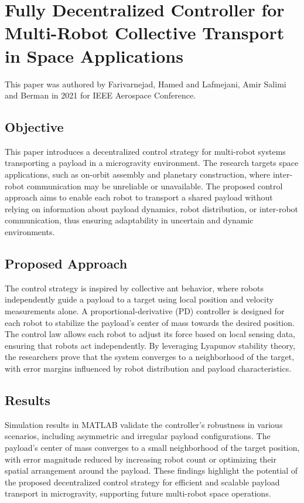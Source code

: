 \documentclass[a4paper,12pt]{article}
\begin{document}
\section{Fully Decentralized Controller for Multi-Robot Collective Transport in Space Applications}
This paper\cite{farivarnejad2021fully} was authored by Farivarnejad, Hamed and Lafmejani, Amir Salimi and Berman in 2021 for IEEE Aerospace Conference. 

\subsection{Objective}
This paper introduces a decentralized control strategy for multi-robot systems transporting a payload in a microgravity environment. The research targets space applications, such as on-orbit assembly and planetary construction, where inter-robot communication may be unreliable or unavailable. The proposed control approach aims to enable each robot to transport a shared payload without relying on information about payload dynamics, robot distribution, or inter-robot communication, thus ensuring adaptability in uncertain and dynamic environments.

\subsection{Proposed Approach}
The control strategy is inspired by collective ant behavior, where robots independently guide a payload to a target using local position and velocity measurements alone. A proportional-derivative (PD) controller is designed for each robot to stabilize the payload’s center of mass towards the desired position. The control law allows each robot to adjust its force based on local sensing data, ensuring that robots act independently. By leveraging Lyapunov stability theory, the researchers prove that the system converges to a neighborhood of the target, with error margins influenced by robot distribution and payload characteristics.

\subsection{Results}
Simulation results in MATLAB validate the controller’s robustness in various scenarios, including asymmetric and irregular payload configurations. The payload’s center of mass converges to a small neighborhood of the target position, with error magnitude reduced by increasing robot count or optimizing their spatial arrangement around the payload. These findings highlight the potential of the proposed decentralized control strategy for efficient and scalable payload transport in microgravity, supporting future multi-robot space operations.
\end{document}
